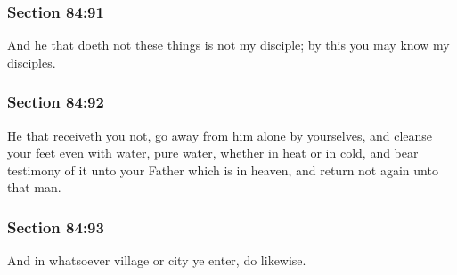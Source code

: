 	\subsubsection{Section 84:91} %
		\label{DC84-91}

		And he that doeth not these things is not my disciple; by this you may know my disciples.


	\subsubsection{Section 84:92} %
		\label{DC84-92}

		He that receiveth you not, go away from him alone by yourselves, and cleanse your feet even with water, pure water, whether in heat or in cold, and bear testimony of it unto your Father which is in heaven, and return not again unto that man.


	\subsubsection{Section 84:93} %
		\label{DC84-93}

		And in whatsoever village or city ye enter, do likewise.


